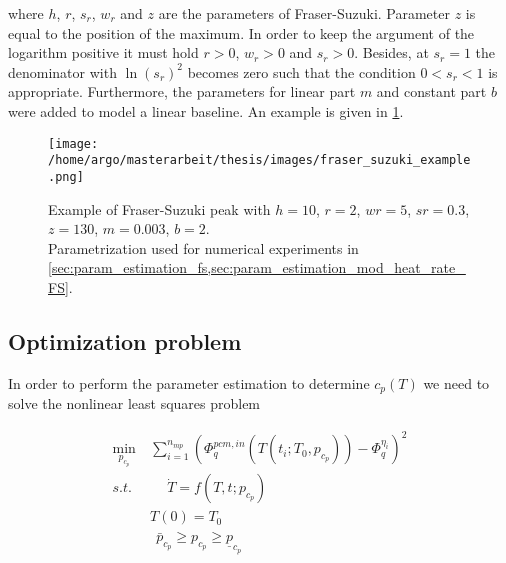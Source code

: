 \documentclass{scrartcl}[12pt, halfparskip]
\numberwithin{equation}{section}
\numberwithin{figure}{section}
\numberwithin{table}{section}
\begin{document}
where $h$, $r$, $s_r$, $w_r$ and $z$ are the parameters of Fraser-Suzuki. 
Parameter $z$ is equal to the position of the maximum.
In order to keep the argument of the logarithm positive it must hold $r > 0$, $w_r > 0$ and $s_r > 0$. Besides, at $s_r = 1$ the denominator with $\ln(s_r)^2$ becomes zero such that the condition $0 < s_r < 1$ is appropriate. Furthermore, the parameters for linear part $m$ and constant part $b$ were added to model a linear baseline. An example is given in \cref{fig:parametrization_example_fraser_suzuki}.

\begin{figure}[H]
	\centering
	\texttt{[image: /home/argo/masterarbeit/thesis/images/fraser\_suzuki\_example.png]}
	\caption{Example of Fraser-Suzuki peak with $h=10$, $r=2$, $wr=5$, $sr=0.3$, $z=130$, $m=0.003$, $b=2$. \\
	Parametrization used for numerical experiments in \cref{sec:param_estimation_fs,sec:param_estimation_mod_heat_rate_FS}.}
	\label{fig:parametrization_example_fraser_suzuki}
\end{figure}











\newpage
\subsection{Optimization problem}
\label{sec:optimization_problem}
In order to perform the parameter estimation to determine $c_p(T)$ we need to solve the nonlinear least squares problem

\begin{align}
	\min_{p_{c_p}} \ & \sum_{i=1}^{n_{mp}} \left(  \varPhi_{q}^{pcm,in}(T(t_i;T_0,p_{c_p})) - \varPhi_q^{\eta_i} \right)^2 \label{eq:parameter_estimation_least_squares_problem} \\
	s.t. \ & \quad \  \dot{T} = f(T,t;p_{c_p}) \nonumber \\
	& T(0) = T_0 \nonumber \\
	& \ \ \bar{p}_{c_p} \ge p_{c_p} \ge \underline{p}_{c_p} \nonumber
\end{align}
\end{document}
